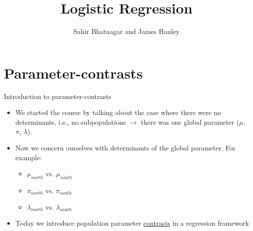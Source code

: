 \documentclass{beamer}\usepackage[]{graphicx}\usepackage[]{color}
\begin{document}




\title{Logistic Regression}
\author{Sahir Bhatnagar and James Hanley}


\maketitle

\section{Parameter-contrasts}

\begin{frame}{Introduction to parameter-contrasts}

\begin{itemize}
	\setlength\itemsep{2em}
	\item We started the course by talking about the case where there were no determinants, i.e., no subpopulations $\to$ there was one global parameter ($\mu$, $\pi$, $\lambda$). \pause 
	\item Now we concern ourselves with determinants of the global parameter. For example:
	\begin{itemize}
		\item $\mu_{north}$ vs. $\mu_{south}$
		\item $\pi_{north}$ vs. $\pi_{south}$
		\item $\lambda_{north}$ vs. $\lambda_{south}$
	\end{itemize}
	\pause 
	\item Today we introduce population parameter \underline{contrasts} in a regression framework
	
\end{itemize}

\end{frame}
\end{document}
